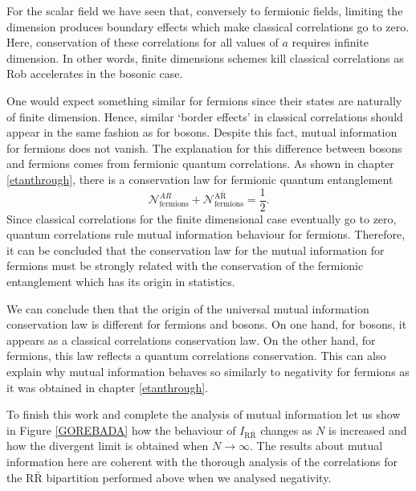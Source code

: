 For the scalar field we have seen that, conversely to fermionic fields,  limiting the dimension produces boundary effects which make classical correlations go to zero. Here, conservation of these correlations for all values of $a$ requires infinite dimension. In other words, finite dimensions schemes kill classical correlations as Rob accelerates in the bosonic case.

One would expect something similar for fermions since their states are naturally of finite dimension. Hence, similar `border effects' in classical correlations should appear in the same fashion as for bosons. Despite this fact, mutual information for fermions does not vanish. The explanation for this difference between bosons and fermions comes from fermionic quantum correlations. As shown in chapter \ref{etanthrough}, there is a conservation law for fermionic quantum entanglement 
\begin{equation}\label{connetfer}
\mathcal{N}^{AR}_{\text{fermions}}+\mathcal{N}^{\text{A}{\bar{\text{R}}}}_{\text{fermions}}=\frac12.
\end{equation}
Since classical correlations for the finite dimensional case eventually go to zero, quantum correlations rule mutual information behaviour for fermions. Therefore, it can be concluded that  the conservation law for the mutual information for fermions must be strongly related with the conservation of the fermionic entanglement which has its origin in statistics. 

We can conclude then that the origin of the universal mutual information conservation law is different for fermions and bosons. On one hand, for bosons, it appears as a classical correlations conservation law. On the other hand, for fermions, this law reflects a quantum correlations conservation. This can also explain why mutual information behaves so similarly to negativity for fermions as it was obtained in chapter \ref{etanthrough}.  

To finish this work and complete the analysis of mutual information let us show in Figure \ref{GOREBADA}  how the behaviour of $I_{\text{R}{\bar{\text{R}}}}$ changes as $N$ is increased and how the divergent limit is obtained when $N\rightarrow\infty$. The results about mutual information here are coherent with the thorough analysis of the correlations for the $\text{R}{\bar{\text{R}}}$ bipartition performed above when we analysed negativity.

